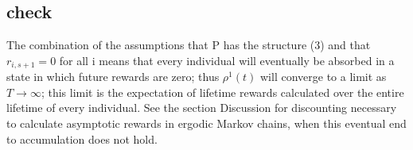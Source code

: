 \documentclass[\main/main.tex]{subfiles}
\begin{document}
\subsection{\color{red}check}
The combination of the assumptions that P has the structure (3) and that $r_{i,s+1} =0$  for all i means that every individual will eventually be absorbed in a state in which future rewards are zero; thus $\rho^1(t)$ will converge to a limit as $T\rightarrow \infty$; this limit is the expectation of lifetime rewards calculated over the entire lifetime of every individual. See the section Discussion for discounting necessary to calculate asymptotic rewards in ergodic Markov chains, when this eventual end to accumulation does not hold. \citep{Caswell2018}
\end{document}
